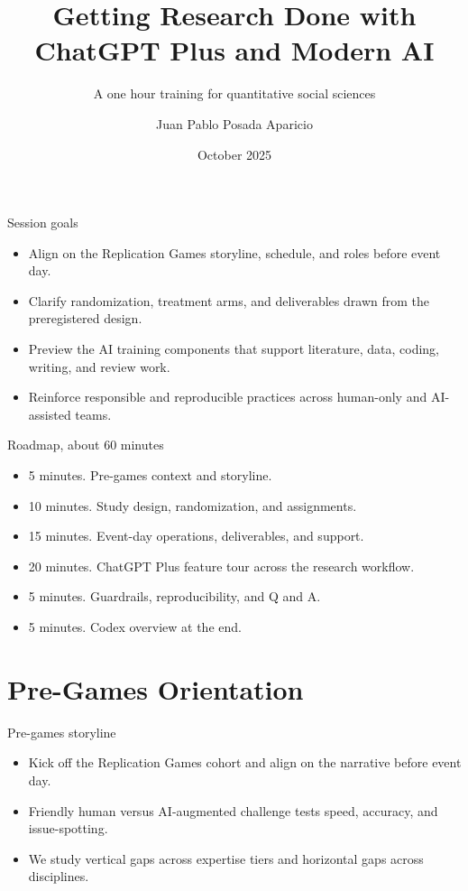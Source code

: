 \documentclass[aspectratio=169,professionalfonts]{beamer}
\title{Getting Research Done with ChatGPT Plus and Modern AI}
\subtitle{A one hour training for quantitative social sciences}
\author{Juan Pablo Posada Aparicio}
\institute{Institute for Replication, University of Ottawa}
\date{October 2025}
\begin{document}
\begin{frame}
  \titlepage
\end{frame}

\begin{frame}{Session goals}
  \begin{itemize}
    \item Align on the Replication Games storyline, schedule, and roles before event day.
    \item Clarify randomization, treatment arms, and deliverables drawn from the preregistered design.
    \item Preview the AI training components that support literature, data, coding, writing, and review work.
    \item Reinforce responsible and reproducible practices across human-only and AI-assisted teams.
  \end{itemize}
\end{frame}

\begin{frame}{Roadmap, about 60 minutes}
  \begin{itemize}
    \item 5 minutes. Pre-games context and storyline.
    \item 10 minutes. Study design, randomization, and assignments.
    \item 15 minutes. Event-day operations, deliverables, and support.
    \item 20 minutes. ChatGPT Plus feature tour across the research workflow.
    \item 5 minutes. Guardrails, reproducibility, and Q and A.
    \item 5 minutes. Codex overview at the end.
  \end{itemize}
\end{frame}

\section{Pre-Games Orientation}

\begin{frame}{Pre-games storyline}
  \begin{itemize}
    \item Kick off the Replication Games cohort and align on the narrative before event day.
    \item Friendly human versus AI-augmented challenge tests speed, accuracy, and issue-spotting.
    \item We study vertical gaps across expertise tiers and horizontal gaps across disciplines.
  \end{itemize}
\end{frame}
\end{document}

